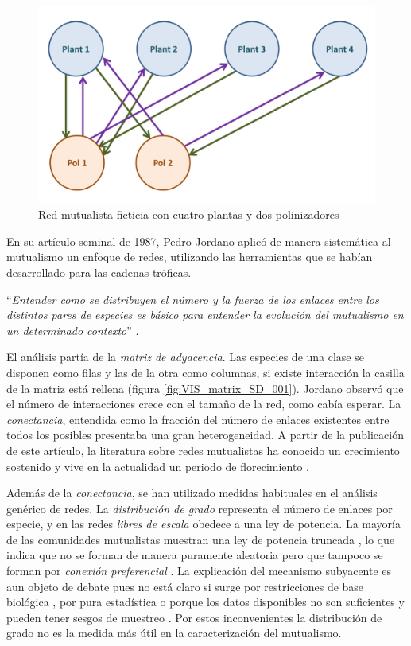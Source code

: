 \begin{figure}[h!]
\centering
\includegraphics[scale=0.30]{Figures/INTRO_bip_ficticia.png}
\caption{Red mutualista ficticia con cuatro plantas y dos polinizadores}
\label{fig:INTRO_bip_ficticia}
\end{figure}

En su artículo seminal de 1987, Pedro Jordano aplicó de manera sistemática al mutualismo un enfoque de redes, utilizando las herramientas que se habían desarrollado para las cadenas tróficas.

\enquote{\itshape Entender como se distribuyen el número y la fuerza de los enlaces entre los distintos pares de especies es básico para entender la evolución del mutualismo en un determinado contexto} \cite{jordano1987patterns}.

El análisis partía de la \textit{matriz de adyacencia}. Las especies de una clase se disponen como filas y las de la otra como columnas, si existe interacción la casilla de la matriz está rellena (figura \ref{fig:VIS_matrix_SD_001}). Jordano observó que el número de interacciones crece con el tamaño de la red, como cabía esperar. La \textit{conectancia}, entendida como la fracción del número de enlaces existentes entre todos los posibles presentaba una gran heterogeneidad. A partir de la publicación de este artículo, la literatura sobre redes mutualistas ha conocido un crecimiento sostenido y vive en la actualidad un periodo de florecimiento \cite{gu2015emerging}.

Además de la \textit{conectancia}, se han utilizado medidas habituales en el análisis genérico de redes. La \textit{distribución de grado} representa el número de enlaces por especie, y en las redes \textit{libres de escala} obedece a una ley de potencia. La mayoría de las comunidades mutualistas muestran una ley de potencia truncada \cite{jordano2003invariant}, lo que indica que no se forman de manera puramente aleatoria pero que tampoco se forman por \textit{conexión preferencial} \cite{barabasi1999emergence}. La explicación del mecanismo subyacente es aun objeto de debate pues no está claro si surge por restricciones de base biológica \cite{bascompte2007plant}, por pura estadística \cite{vazquez2005degree} o porque los datos disponibles no son suficientes y pueden tener sesgos de muestreo \cite{okuyama2008mutualistic, williams2011biology}. Por estos inconvenientes la distribución de grado no es la medida más útil en la caracterización del mutualismo.

